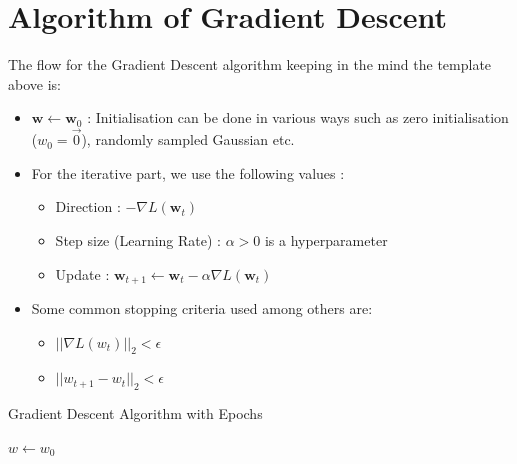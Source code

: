 \documentclass{report}
\begin{document}
\section{Algorithm of Gradient Descent}
The flow for the Gradient Descent algorithm keeping in the mind the template above is:
\begin{itemize}
  \item ${\textbf{w}} \leftarrow \mathbf{w}_{0}$ : Initialisation can be done in various ways such as zero initialisation ($w_{0} = \Vec{0}$), randomly sampled Gaussian etc.
  \item For the iterative part, we use the following values :
        \begin{itemize}
          \item Direction : $- \nabla L(\mathbf{w}_{t})$
          \item Step size (Learning Rate) : $\alpha > 0$ is a hyperparameter
          \item Update : $\mathbf{w}_{t+1} \leftarrow \mathbf{w}_{t} - \alpha \nabla L(\mathbf{w}_{t})$
        \end{itemize}
  \item Some common stopping criteria used among others are:
        \begin{itemize}
          \item $|| \nabla L(w_{t}) ||_{2} < \epsilon$
          \item $|| w_{t+1} - w_{t} ||_{2} < \epsilon$
        \end{itemize}
\end{itemize}

\begin{algorithm}[H]
  \caption{Gradient Descent Algorithm with Epochs}
  \label{algo:gradient_descent_epochs}
  $w \gets w_0$\;
\end{algorithm}
\end{document}
